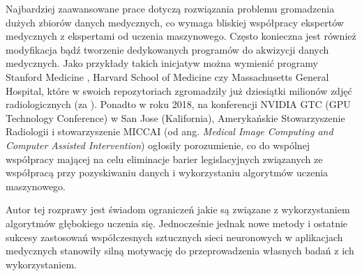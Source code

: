 Najbardziej zaawansowane prace dotyczą rozwiązania problemu gromadzenia dużych zbiorów danych medycznych, co wymaga bliskiej współpracy ekspertów medycznych z ekspertami od uczenia maszynowego. Często konieczna jest również modyfikacja bądź tworzenie dedykowanych programów do akwizycji danych medycznych. Jako przykłady takich inicjatyw można wymienić programy Stanford Medicine \cite{MedicalImageNet}, Harvard School of Medicine \cite{HMS} czy Massachusetts General Hospital, które w swoich repozytoriach zgromadziły już dziesiątki milionów zdjęć radiologicznych (za \cite{MGH}). Ponadto w roku 2018, na konferencji NVIDIA GTC (GPU Technology Conference) w San Jose (Kalifornia), Amerykańskie Stowarzyszenie Radiologii i stowarzyszenie MICCAI (od ang. \textit{Medical Image Computing and Computer Assisted Intervention}) ogłosiły porozumienie, co do wspólnej współpracy mającej na celu eliminacje barier legislacyjnych związanych ze współpracą przy pozyskiwaniu danych i wykorzystaniu algorytmów uczenia maszynowego.

Autor tej rozprawy jest świadom ograniczeń jakie są związane z wykorzystaniem algorytmów głębokiego uczenia się. Jednocześnie jednak nowe metody i ostatnie sukcesy zastosowań współczesnych sztucznych sieci neuronowych w aplikacjach medycznych stanowiły silną motywację do przeprowadzenia własnych badań z ich wykorzystaniem.


    
